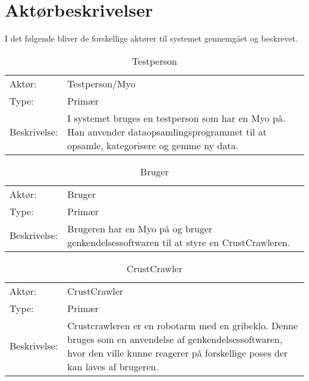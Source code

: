 \thispagestyle{fancy}
\chapter{Aktørbeskrivelser}
\label{chp:aktorbeskrivelser}
I det følgende bliver de forskellige aktører til systemet gennemgået og beskrevet.
\bgroup
\def\arraystretch{1.8}
\begin{center}
	\begin{table}[htbp]
		\begin{tabular}{lp{10cm}}
			\rowcolor{grey} Aktør:		& Testperson/Myo \\
			Type: 	& Primær\\
			Beskrivelse:				& I systemet bruges en testperson som har en Myo på. Han anvender dataopsamlingsprogrammet til at opsamle, kategorisere og gemme ny data.
		\end{tabular}
		\caption{Testperson}
		\label{tab:testperson}
	\end{table}
\end{center}

\begin{center}
	\begin{table}[htbp]
		\begin{tabular}{lp{10cm}}
			\rowcolor{grey} Aktør:		& Bruger \\
			Type: 	& Primær \\
			Beskrivelse:				& Brugeren har en Myo på og bruger genkendelsessoftwaren til at styre en CrustCrawleren.
		\end{tabular}
		\caption{Bruger}
		\label{tab:bruger}
	\end{table}
\end{center}

\begin{center}
	\begin{table}[htbp]
		\begin{tabular}{lp{10cm}}
			\rowcolor{grey} Aktør:		& CrustCrawler \\
			Type: 	& Primær \\
			Beskrivelse:				& Crustcrawleren er en robotarm med en gribeklo. Denne bruges som en anvendelse af genkendelsessoftwaren, hvor den ville kunne reagerer på forskellige poses der kan laves af brugeren.
		\end{tabular}
		\caption{CrustCrawler}
		\label{tab:crustcrawler}
	\end{table}
\end{center}
\egroup